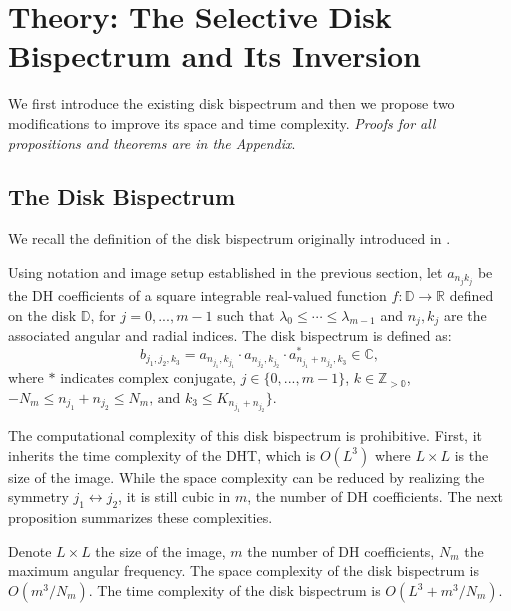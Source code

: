\section{Theory: The Selective Disk Bispectrum and Its Inversion}
\label{sec:theory}


We first introduce the existing disk bispectrum \cite{zhao2014rotationally} and then we propose two modifications to improve its space and time complexity. \textit{Proofs for all propositions and theorems are in the Appendix}.

\subsection{The Disk Bispectrum}

We recall the definition of the disk bispectrum originally introduced in \citep{zhao2014rotationally}.

\begin{definition} Using notation and image setup established in the previous section, let $a_{n_jk_j}$ be the DH coefficients of a square integrable real-valued function $f: \mathbb{D} \to \mathbb{R}$ defined on the disk $\mathbb{D}$, for $j=0, ..., m-1$ such that $\lambda_0 \leq \cdots \leq \lambda_{m-1}$ and $n_j, k_j$ are the associated angular and radial indices. The disk bispectrum is defined as:
    \begin{equation}
    b_{j_1, j_2, k_3} = a_{n_{j_1},k_{j_1}} \cdot a_{n_{j_2},k_{j_2}}\cdot a_{n_{j_1}+n_{j_2},k_3}^* \in \mathbb{C},
\end{equation}
\label{eq:disk_bispectrum}
where $*$ indicates complex conjugate, $j \in \{0, ..., m-1\}$, $k \in \mathbb{Z_{>0}}$, $-N_m \leq n_{j_1}+n_{j_2} \leq N_m \text{, and } k_3 \le K_{n_{j_1} + n_{j_2}} \}$.
\end{definition}

The computational complexity of this disk bispectrum is prohibitive. First, it inherits the time complexity of the DHT, which is $O(L^3)$ where $L\times L$ is the size of the image. While the space complexity can be reduced by realizing the symmetry $j_1 \leftrightarrow j_2$, it is still cubic in $m$, the number of DH coefficients. The next proposition summarizes these complexities.

\begin{proposition}
    Denote $L \times L$ the size of the image, $m$ the number of DH coefficients, $N_m$ the maximum angular frequency. The space complexity of the disk bispectrum is $O(m^3/N_m)$. The time complexity of the disk bispectrum is  $O(L^3 + m^3/N_m)$.
\end{proposition}

